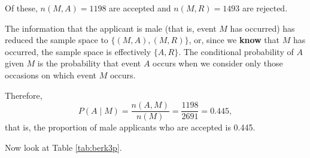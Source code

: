 \documentclass[
  british,
  11pt,
  openany, a4paper]{book}
\begin{document}
Of these, \(n(M , A) = 1198\) are accepted and \(n(M , R) = 1493\) are rejected.

The information that the applicant is male (that is, event \(M\) has occurred) has reduced the sample space to \(\{(M , A),(M , R)\}\), or, since we \textbf{know} that
\(M\) has occurred, the sample space is effectively \(\{A,R\}\). The conditional probability of \(A\) given \(M\) is the probability that event \(A\) occurs when we consider only those occasions on which event \(M\) occurs.

Therefore,
\begin{equation}
P(A \mid M) = \frac{n(A, M)}{n(M)} = \frac{1198}{2691} = 0.445,
\label{eq:freqs}
\end{equation}
that is, the proportion of male applicants who are accepted is 0.445.

Now look at Table \ref{tab:berk3p}.

 
  \providecommand{\huxb}[2]{\arrayrulecolor[RGB]{#1}\global\arrayrulewidth=#2pt}
  \providecommand{\huxvb}[2]{\color[RGB]{#1}\vrule width #2pt}
  \providecommand{\huxtpad}[1]{\rule{0pt}{#1}}
  \providecommand{\huxbpad}[1]{\rule[-#1]{0pt}{#1}}
\end{document}
